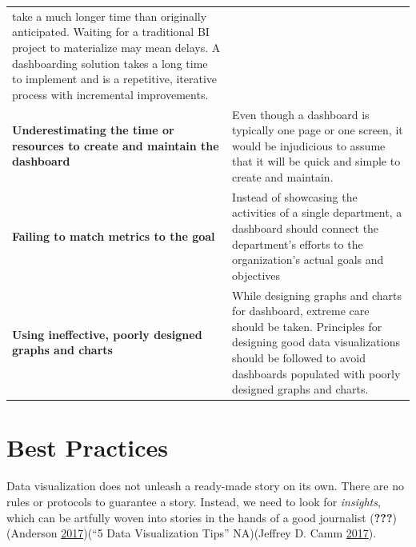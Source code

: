 \documentclass[]{book}
\begin{document}
\begin{longtable}[]{@{}ll@{}}
\begin{minipage}[t]{0.66\columnwidth}
take a much longer time than originally anticipated. Waiting for a
traditional BI project to materialize may mean delays. A dashboarding
solution takes a long time to implement and is a repetitive, iterative
process with incremental improvements.\strut
\end{minipage}\tabularnewline
\begin{minipage}[t]{0.29\columnwidth}\raggedright\strut
\textbf{Underestimating the time or resources to create and maintain the
dashboard}\strut
\end{minipage} & \begin{minipage}[t]{0.66\columnwidth}\raggedright\strut
Even though a dashboard is typically one page or one screen, it would be
injudicious to assume that it will be quick and simple to create and
maintain.\strut
\end{minipage}\tabularnewline
\begin{minipage}[t]{0.29\columnwidth}\raggedright\strut
\textbf{Failing to match metrics to the goal}\strut
\end{minipage} & \begin{minipage}[t]{0.66\columnwidth}\raggedright\strut
Instead of showcasing the activities of a single department, a dashboard
should connect the department's efforts to the organization's actual
goals and objectives\strut
\end{minipage}\tabularnewline
\begin{minipage}[t]{0.29\columnwidth}\raggedright\strut
\textbf{Using ineffective, poorly designed graphs and charts}\strut
\end{minipage} & \begin{minipage}[t]{0.66\columnwidth}\raggedright\strut
While designing graphs and charts for dashboard, extreme care should be
taken. Principles for designing good data visualizations should be
followed to avoid dashboards populated with poorly designed graphs and
charts.\strut
\end{minipage}\tabularnewline
\bottomrule
\end{longtable}

\section{Best Practices}\label{best-practices}

Data visualization does not unleash a ready-made story on its own. There
are no rules or protocols to guarantee a story. Instead, we need to look
for \emph{insights}, which can be artfully woven into stories in the
hands of a good journalist ({\textbf{???}})(Anderson
\protect\hyperlink{ref-design_principles}{2017})(``5 Data Visualization
Tips'' NA)(Jeffrey D. Camm
\protect\hyperlink{ref-practitioners_guide}{2017}).
\end{document}

